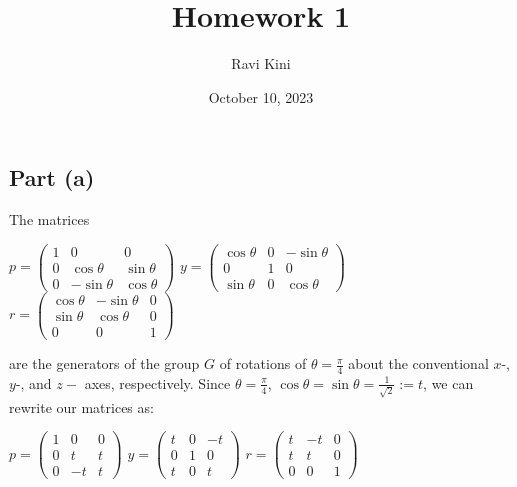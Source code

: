\documentclass{article}
\title{Homework 1}
\author{Ravi Kini}
\date{October 10, 2023}
\begin{document}
\maketitle

\problem
\subsection*{Part (a)}
The matrices
\begin{center}
    $p = 
    \begin{pmatrix} 
        1 & 0 & 0 \\
        0 & \cos\theta & \sin\theta  \\
        0 & -\sin\theta & \cos\theta
    \end{pmatrix}$
    \hspace{.25in}
    $y = 
    \begin{pmatrix} 
        \cos\theta & 0 & -\sin\theta \\
        0 & 1 &  0 \\
        \sin\theta & 0 & \cos\theta
    \end{pmatrix}$
    \hspace{.25in}
    $r = 
    \begin{pmatrix} 
        \cos\theta & -\sin\theta & 0 \\
        \sin\theta & \cos\theta  & 0 \\
        0 & 0 & 1
    \end{pmatrix}
    $
\end{center}
are the generators of the group $G$ of rotations of $\theta = \frac{\pi}{4}$ about the conventional $x$-, $y$-, and $z-$ axes, respectively. Since $\theta = \frac{\pi}{4}$, $\cos \theta = \sin \theta = \frac{1}{\sqrt{2}} := t$, we can rewrite our matrices as:
\begin{center}
    $p = 
    \begin{pmatrix} 
        1 & 0 & 0 \\
        0 & t & t  \\
        0 & -t & t
    \end{pmatrix}$
    \hspace{.25in}
    $y = 
    \begin{pmatrix} 
        t & 0 & -t \\
        0 & 1 &  0 \\
        t & 0 & t
    \end{pmatrix}$
    \hspace{.25in}
    $r = 
    \begin{pmatrix} 
        t & -t & 0 \\
        t  & t  & 0 \\
        0 & 0 & 1
    \end{pmatrix}
    $
\end{center}
\end{document}
